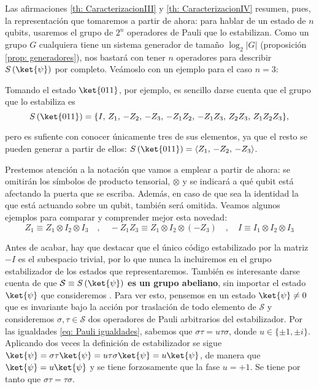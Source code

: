 \documentclass[11pt,a4paper,twoside,pdf]{article}
\numberwithin{equation}{section}
\begin{document}
		Las afirmaciones \ref{th: CaracterizacionIII} y \ref{th: CaracterizacionIV} resumen, pues, la representación que tomaremos a partir de ahora: para hablar de un estado de $n$ qubits, usaremos el grupo de $2^n$ operadores de Pauli que lo estabilizan. Como un grupo $G$ cualquiera tiene un sistema generador de tamaño $\log_2|G|$ (proposición \ref{prop: generadores}), nos bastará con tener $n$ operadores para describir $S\left( \ket{\psi}\right) $ por completo. Veámoslo con un ejemplo para el caso $n=3$:
		
		Tomando el estado $\ket{011}$, por ejemplo, es sencillo darse cuenta que el grupo que lo estabiliza es 
			\begin{equation*}
				S\left( \ket{011} \right) =\{ I,\, Z_1,\, -Z_2,\, -Z_3,\, -Z_1Z_2,\, -Z_1Z_3,\, Z_2Z_3,\, Z_1Z_2Z_3 \},
			\end{equation*}
		
		pero es sufiente con conocer únicamente tres de sus elementos, ya que el resto se pueden generar a partir de ellos: $S\left( \ket{011} \right) = \left\langle Z_1, \, -Z_2, \, -Z_3 \right\rangle$.
		
		Prestemos atención a la notación que vamos a emplear a partir de ahora: se omitirán los símbolos de producto tensorial, $\otimes$ y se indicará a qué qubit está afectando la puerta que se escriba. Además, en caso de que sea la identidad la que está actuando sobre un qubit, también será omitida. Veamos algunos ejemplos para comparar y comprender mejor esta novedad:
			\begin{equation*} 
			Z_1 \equiv Z_1\otimes I_2 \otimes I_3 \quad , \quad
					-Z_1Z_3 \equiv Z_1\otimes I_2 \otimes (-Z_3) \quad , \quad I \equiv I_1\otimes I_2 \otimes I_3 
			\end{equation*}
		
		Antes de acabar, hay que destacar que el único código estabilizado por la matriz $-I$ es el subespacio trivial, por lo que nunca la incluiremos en el grupo estabilizador de los estados que representaremos. También es interesante darse cuenta de que \textbf{$\mathcal{S} \equiv S\left( \ket{\psi}\right)$ es un grupo abeliano}, sin importar el estado $\ket{\psi}$ que consideremos \cite{Bermejo VandenNest}.  Para ver esto, pensemos en un estado $\ket{\psi}\ne 0$ que es invariante bajo la acción por traslación de todo elemento de $\mathcal{S}$ y consideremos $\sigma,\tau \in \mathcal{S}$ dos operadores de Pauli arbitrarios del estabilizador. Por las igualdades \ref{eq: Pauli igualdades}, sabemos que $\sigma \tau = u \tau \sigma$, donde $u\in \{\pm1,\pm i\}$. Aplicando dos veces la definición de estabilizador se sigue $\ket{\psi}=\sigma\tau\ket{\psi}=u\tau\sigma\ket{\psi}=u\ket{\psi}$, de manera que $\ket{\psi}=u\ket{\psi}$ y se tiene forzosamente que la fase $u=+1$. Se tiene por tanto que $\sigma\tau=\tau\sigma$. 
		
\end{document}
